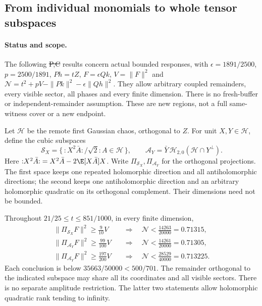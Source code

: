 \subsection{From individual monomials to whole tensor subspaces}
\label{sec:whole-slice-contact}

\paragraph{Status and scope.}
The following \st{P,C} results concern actual bounded responses, with
$\epsilon=1891/2500$, $p=2500/1891$, $Ph=tZ$, $F=\epsilon Qk$,
$V=\|F\|^2$ and $\mathcal N=t^2+pV-\|Pk\|^2-\epsilon\|Qh\|^2$.
They allow arbitrary coupled remainders, every visible sector, all
phases and every finite dimension. There is no fresh-buffer or
independent-remainder assumption. These are new regions, not a full
same-witness cover or a new endpoint.

Let $\mathcal H$ be the remote first Gaussian chaos, orthogonal to $Z$.
For unit $X,Y\in\mathcal H$, define the cubic subspaces
\[
 \mathcal S_X=\{\,{:}X^2\bar A{:}/\sqrt2:A\in\mathcal H\,\},
 \qquad
 \mathcal A_Y=\bar Y\,\mathcal H_{2,0}(\mathcal H\cap Y^\perp).
\]
Here ${:}X^2\bar A{:}=X^2\bar A-2\E[X\bar A]X$.
Write $\Pi_{\mathcal S_X},\Pi_{\mathcal A_Y}$ for the orthogonal
projections. The first space keeps one repeated holomorphic direction
and all antiholomorphic directions; the second keeps one antiholomorphic
direction and an arbitrary holomorphic quadratic on its orthogonal
complement. Their dimensions need not be bounded.

\begin{theorem}
\label{thm:whole-slice-contact}
Throughout $21/25\le t\le851/1000$, in every finite dimension,
\[
 \boxed{\begin{aligned}
 \|\Pi_{\mathcal S_X}F\|^2\ge\frac9{10}V
   &\quad\Longrightarrow\quad\mathcal N<\frac{14263}{20000}=0.71315,\\
 \|\Pi_{\mathcal A_Y}F\|^2\ge\frac{99}{100}V
   &\quad\Longrightarrow\quad\mathcal N<\frac{14261}{20000}=0.71305,\\
 \|\Pi_{\mathcal A_Y}F\|^2\ge\frac{197}{200}V
   &\quad\Longrightarrow\quad\mathcal N<\frac{28529}{40000}=0.713225.
 \end{aligned}}
\]
Each conclusion is below $35663/50000<500/701$.
The remainder orthogonal to the indicated subspace may share all its
coordinates and all visible sectors. There is no separate amplitude
restriction. The latter two statements allow holomorphic quadratic
rank tending to infinity.
\end{theorem}

